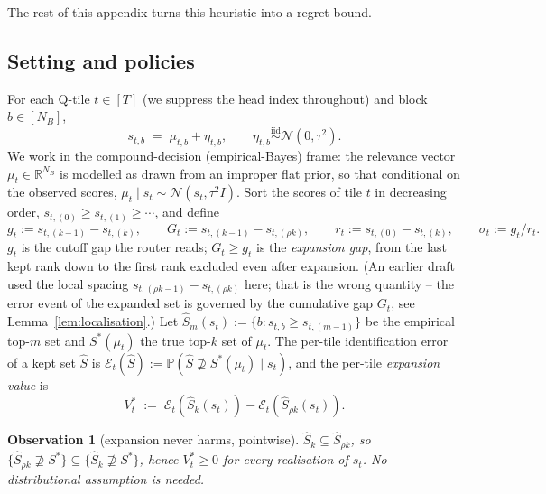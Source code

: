 \documentclass[11pt]{article}
\newtheorem{observation}{Observation}
\theoremstyle{remark}
\newcommand{\NB}{N_{\!B}}
\begin{document}
The rest of this appendix turns this heuristic into a regret bound.

\subsection{Setting and policies}\label{app:bai:setup}

For each Q-tile $t \in [T]$ (we suppress the head index throughout) and block $b \in [\NB]$,
\begin{equation}\label{eq:bai-noise}
    s_{t,b} \;=\; \mu_{t,b} + \eta_{t,b}, \qquad \eta_{t,b} \stackrel{\text{iid}}{\sim} \mathcal N(0, \tau^2).
\end{equation}
We work in the compound-decision (empirical-Bayes) frame: the relevance vector $\mu_t \in \mathbb R^{\NB}$ is modelled as drawn from an improper flat prior, so that conditional on the observed scores, $\mu_t \mid s_t \sim \mathcal N(s_t, \tau^2 I)$. Sort the scores of tile $t$ in decreasing order, $s_{t,(0)} \ge s_{t,(1)} \ge \cdots$, and define
\begin{equation}\label{eq:gaps}
g_t := s_{t,(k-1)} - s_{t,(k)}, \qquad G_t := s_{t,(k-1)} - s_{t,(\rho k)}, \qquad r_t := s_{t,(0)} - s_{t,(k)}, \qquad \sigma_t := g_t / r_t.
\end{equation}
$g_t$ is the cutoff gap the router reads; $G_t \ge g_t$ is the \emph{expansion gap}, from the last kept rank down to the first rank excluded even after expansion. (An earlier draft used the local spacing $s_{t,(\rho k - 1)} - s_{t,(\rho k)}$ here; that is the wrong quantity -- the error event of the expanded set is governed by the cumulative gap $G_t$, see Lemma~\ref{lem:localisation}.) Let $\widehat S_m(s_t) := \{b : s_{t,b} \ge s_{t,(m-1)}\}$ be the empirical top-$m$ set and $S^*(\mu_t)$ the true top-$k$ set of $\mu_t$. The per-tile identification error of a kept set $\widehat S$ is $\mathcal E_t(\widehat S) := \mathbb P(\widehat S \not\supseteq S^*(\mu_t) \mid s_t)$, and the per-tile \emph{expansion value} is
\begin{equation}\label{eq:Vstar}
    V^*_t \;:=\; \mathcal E_t(\widehat S_k(s_t)) - \mathcal E_t(\widehat S_{\rho k}(s_t)).
\end{equation}

\begin{observation}[expansion never harms, pointwise]\label{obs:monotone}
$\widehat S_k \subseteq \widehat S_{\rho k}$, so $\{\widehat S_{\rho k} \not\supseteq S^*\} \subseteq \{\widehat S_k \not\supseteq S^*\}$, hence $V^*_t \ge 0$ for every realisation of $s_t$. No distributional assumption is needed.
\end{observation}
\end{document}
